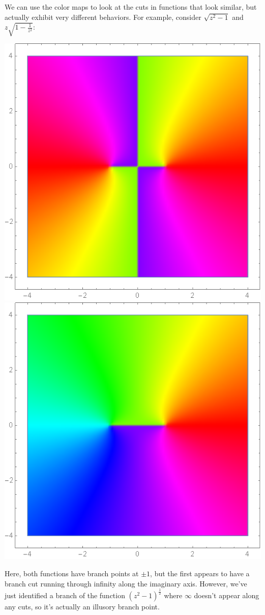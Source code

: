 \documentclass[12pt]{scrartcl}
\begin{document}
We can use the color maps to look at the cuts in functions that look similar, but actually exhibit very different behaviors. For example, consider $\sqrt{z^2-1}$ and $z \sqrt{1-\frac{1}{z^2}}$:
\begin{center}
	\includegraphics[scale=0.27]{images/sqrtzsqrminus1.png}
	\includegraphics[scale=0.27]{images/sqrtzsqrminus2.png}
\end{center}
Here, both functions have branch points at $\pm 1$, but the first appears to have a branch cut running through infinity along the imaginary axis. However, we've just identified a branch of the function $(z^2-1)^{\frac{1}{2}}$ where $\infty$ doesn't appear along any cuts, so it's actually an illusory branch point.
\end{document}
